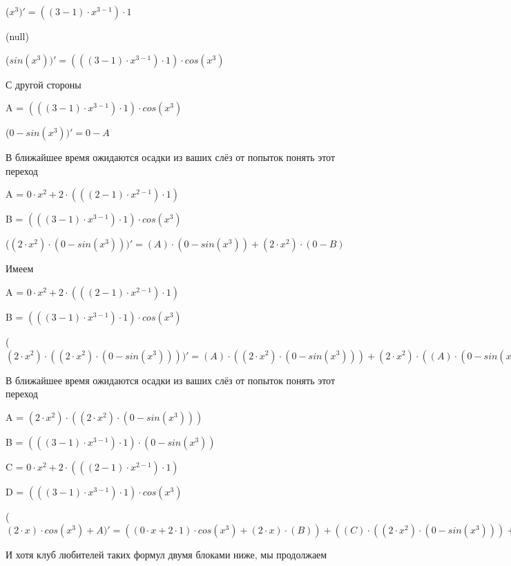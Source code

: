\documentclass[12pt,a4paper,fleqn]{article}
\begin{document}
\begin{center}
 ($x^{3})'
  = ((3-1) \cdot x^{3-1}) \cdot 1$\end{center}
(null)\cite{link4}

\begin{center}
 ($sin(x^{3}))'
  = (((3-1) \cdot x^{3-1}) \cdot 1) \cdot cos(x^{3})$\end{center}
С другой стороны

\begin{center}
A = $(((3-1) \cdot x^{3-1}) \cdot 1) \cdot cos(x^{3})$\end{center}
\begin{center}
 ($0-sin(x^{3}))'
  = 0-A$\end{center}
В ближайшее время ожидаются осадки из ваших слёз от попыток понять этот переход

\begin{center}
A = $0 \cdot x^{2}+2 \cdot (((2-1) \cdot x^{2-1}) \cdot 1)$\end{center}
\begin{center}
B = $(((3-1) \cdot x^{3-1}) \cdot 1) \cdot cos(x^{3})$\end{center}
\begin{center}
 ($(2 \cdot x^{2}) \cdot (0-sin(x^{3})))'
  = (A) \cdot (0-sin(x^{3}))+(2 \cdot x^{2}) \cdot (0-B)$\end{center}
Имеем

\begin{center}
A = $0 \cdot x^{2}+2 \cdot (((2-1) \cdot x^{2-1}) \cdot 1)$\end{center}
\begin{center}
B = $(((3-1) \cdot x^{3-1}) \cdot 1) \cdot cos(x^{3})$\end{center}
\begin{center}
 ($(2 \cdot x^{2}) \cdot ((2 \cdot x^{2}) \cdot (0-sin(x^{3}))))'
  = (A) \cdot ((2 \cdot x^{2}) \cdot (0-sin(x^{3})))+(2 \cdot x^{2}) \cdot ((A) \cdot (0-sin(x^{3}))+(2 \cdot x^{2}) \cdot (0-B))$\end{center}
В ближайшее время ожидаются осадки из ваших слёз от попыток понять этот переход

\begin{center}
A = $(2 \cdot x^{2}) \cdot ((2 \cdot x^{2}) \cdot (0-sin(x^{3})))$\end{center}
\begin{center}
B = $(((3-1) \cdot x^{3-1}) \cdot 1) \cdot (0-sin(x^{3}))$\end{center}
\begin{center}
C = $0 \cdot x^{2}+2 \cdot (((2-1) \cdot x^{2-1}) \cdot 1)$\end{center}
\begin{center}
D = $(((3-1) \cdot x^{3-1}) \cdot 1) \cdot cos(x^{3})$\end{center}
\begin{center}
 ($(2 \cdot x) \cdot cos(x^{3})+A)'
  = ((0 \cdot x+2 \cdot 1) \cdot cos(x^{3})+(2 \cdot x) \cdot (B))+((C) \cdot ((2 \cdot x^{2}) \cdot (0-sin(x^{3})))+(2 \cdot x^{2}) \cdot ((C) \cdot (0-sin(x^{3}))+(2 \cdot x^{2}) \cdot (0-D)))$\end{center}
И хотя клуб любителей таких формул двумя блоками ниже, мы продолжаем
\end{document}
